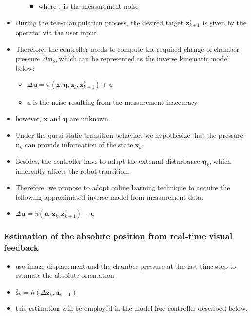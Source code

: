 \documentclass[journal,onecolumn]{IEEEtran}
\begin{document}
\begin{itemize}
\begin{itemize}
\begin{itemize}
\item where \bm{\epsilon}\(_{\text{k}}\) is the measurement noise
\end{itemize}
\end{itemize}
\item During the tele-manipulation process, the desired target \(\bm{z}_{k+1}^*\) is given by the operator via the user input.
\item Therefore, the controller needs to compute the required change of chamber pressure \(\Delta \bm{u}_k\), which can be represented as the inverse kinematic model below:
\begin{itemize}
\item \(\Delta \bm{u}=\tilde \pi(\bm{x}, \bm{\eta}, \bm{z}_k, \bm{z}_{k+1}^{*}) + \bm{\epsilon}\)
\item \(\bm{\epsilon}\) is the noise resulting from the measurement inaccuracy
\end{itemize}
\item however, \(\bm{x}\) and \(\bm{\eta}\) are unknown.
\item Under the quasi-static transition behavior, we hypothesize that the pressure \(\bm{u}_k\) can provide information of the state \(\bm{x}_k\).
\item Besides, the controller have to adapt the external disturbance \(\bm{\eta}_k\), which inherently affects the robot transition.
\item Therefore, we propose to adopt online learning technique to acquire the following approximated inverse model from measurement data:
\item \(\Delta \bm{u}= \pi(\bm{u}, \bm{z}_k, \bm{z}_{k+1}^{*}) + \bm{\epsilon}\)
\end{itemize}

\subsubsection{Estimation of the absolute position from real-time visual feedback}
\label{sec:org634f1af}
\begin{itemize}
\item use image displacement and the chamber pressure at the last time step to estimate the absolute orientation
\item \(\bm{\hat s}_k = h(\Delta \bm{z}_k,\bm{u}_{k-1})\)
\item this estimation will be employed in the model-free controller described below.
\end{itemize}
\end{document}

